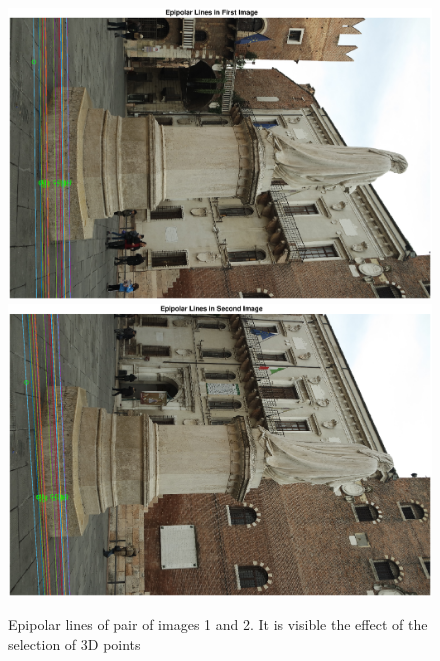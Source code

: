 \documentclass[11pt]{article}
\begin{document}
\begin{figure}[H]
    \centering
    \includegraphics[scale=0.5]{images/epipolar1.eps}
    \qquad
    \includegraphics[scale=0.5]{images/epipolar2.eps}
    \caption{Epipolar lines of pair of images 1 and 2. It is visible the effect of the selection of 3D points}
    \label{fig:epipolar}
\end{figure}
\end{document}
